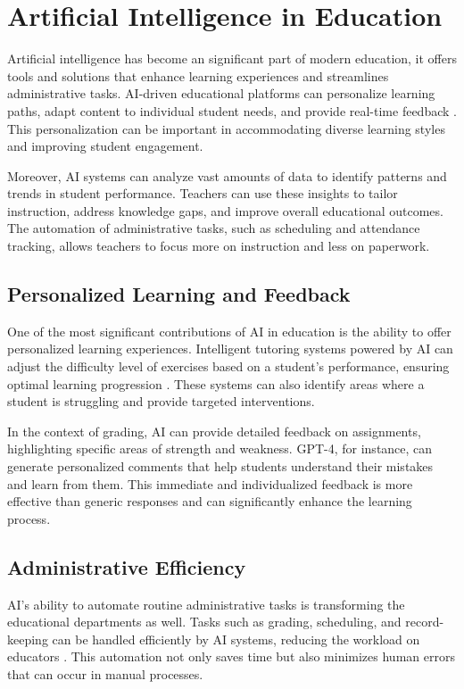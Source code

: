 \documentclass[ms,twoside,print]{nuthesis}
\begin{document}
\section{Artificial Intelligence in Education}

Artificial intelligence has become an significant part of modern education, it offers tools and solutions that enhance learning experiences and streamlines administrative tasks. AI-driven educational platforms can personalize learning paths, adapt content to individual student needs, and provide real-time feedback \cite{Alto2023}. This personalization can be important in accommodating diverse learning styles and improving student engagement.

Moreover, AI systems can analyze vast amounts of data to identify patterns and trends in student performance. Teachers can use these insights to tailor instruction, address knowledge gaps, and improve overall educational outcomes. The automation of administrative tasks, such as scheduling and attendance tracking, allows teachers to focus more on instruction and less on paperwork.

\subsection{Personalized Learning and Feedback}

One of the most significant contributions of AI in education is the ability to offer personalized learning experiences. Intelligent tutoring systems powered by AI can adjust the difficulty level of exercises based on a student's performance, ensuring optimal learning progression \cite{Alto2023}. These systems can also identify areas where a student is struggling and provide targeted interventions.

In the context of grading, AI can provide detailed feedback on assignments, highlighting specific areas of strength and weakness. GPT-4, for instance, can generate personalized comments that help students understand their mistakes and learn from them. This immediate and individualized feedback is more effective than generic responses and can significantly enhance the learning process.

\subsection{Administrative Efficiency}

AI's ability to automate routine administrative tasks is transforming the educational departments as well. Tasks such as grading, scheduling, and record-keeping can be handled efficiently by AI systems, reducing the workload on educators \cite{Alto2023}. This automation not only saves time but also minimizes human errors that can occur in manual processes.
\end{document}
